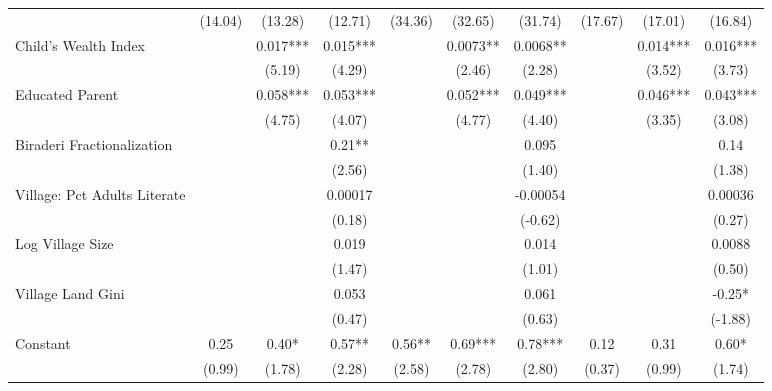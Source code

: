 \begin{sidewaystable}[htbp]
\begin{tabular}{l*{9}{c}}
                &  (14.04)   &  (13.28)   &  (12.71)   &  (34.36)   &  (32.65)   &  (31.74)   &  (17.67)   &  (17.01)   &  (16.84)   \\
Child's Wealth Index&            &    0.017***&    0.015***&            &   0.0073** &   0.0068** &            &    0.014***&    0.016***\\
                &            &   (5.19)   &   (4.29)   &            &   (2.46)   &   (2.28)   &            &   (3.52)   &   (3.73)   \\
Educated Parent &            &    0.058***&    0.053***&            &    0.052***&    0.049***&            &    0.046***&    0.043***\\
                &            &   (4.75)   &   (4.07)   &            &   (4.77)   &   (4.40)   &            &   (3.35)   &   (3.08)   \\
Biraderi Fractionalization&            &            &     0.21** &            &            &    0.095   &            &            &     0.14   \\
                &            &            &   (2.56)   &            &            &   (1.40)   &            &            &   (1.38)   \\
Village: Pct Adults Literate&            &            &  0.00017   &            &            & -0.00054   &            &            &  0.00036   \\
                &            &            &   (0.18)   &            &            &  (-0.62)   &            &            &   (0.27)   \\
Log Village Size&            &            &    0.019   &            &            &    0.014   &            &            &   0.0088   \\
                &            &            &   (1.47)   &            &            &   (1.01)   &            &            &   (0.50)   \\
Village Land Gini&            &            &    0.053   &            &            &    0.061   &            &            &    -0.25*  \\
                &            &            &   (0.47)   &            &            &   (0.63)   &            &            &  (-1.88)   \\
Constant        &     0.25   &     0.40*  &     0.57** &     0.56** &     0.69***&     0.78***&     0.12   &     0.31   &     0.60*  \\
                &   (0.99)   &   (1.78)   &   (2.28)   &   (2.58)   &   (2.78)   &   (2.80)   &   (0.37)   &   (0.99)   &   (1.74)   \\

\end{tabular}
\end{sidewaystable}
